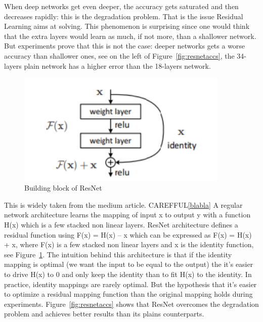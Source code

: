 When deep networks get even deeper, the accuracy gets saturated and then decreases rapidly: this is the degradation problem. That is the issue Residual Learning aims at solving. This phenomenon is surprising since one would think that the extra layers would learn as much, if not more, than a shallower network. But experiments prove that this is not the case: deeper networks gets a worse accuracy than shallower ones, see on the left of Figure~\ref{fig:resnetaccs}, the 34-layers plain network has a higher error than the 18-layers network. 

\begin{figure}[!htp]
    \centering
        \includegraphics[width=0.9\textwidth]{./figures/02-resnet_block}
        \caption{Building block of ResNet}\label{fig:resnetblock}
\end{figure}
This is widely taken from the medium article. CAREFFUL\ref{blabla}
A regular network architecture learns the mapping of input x to output y with a function H(x) which is a few stacked non linear layers. ResNet architecture defines a residual function using F(x) = H(x) – x which can be expressed as F(x) = H(x) + x, where F(x) is a few stacked non linear layers and x is the identity function, see Figure~\ref{fig:resnetblock}. The intuition behind this architecture is that if the identity mapping is optimal (we want the input to be equal to the output) the it’s easier to drive H(x) to 0 and only keep the identity than to fit H(x) to the identity. In practice, identity mappings are rarely optimal. But the hypothesis that it’s easier to optimize a residual mapping function than the original  mapping holds during experiments. Figure~\ref{fig:resnetaccs} shows that ResNet overcomes the degradation problem and achieves better results than its plains counterparts.



